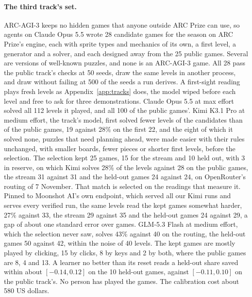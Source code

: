 \paragraph{The third track's set.} ARC-AGI-3 keeps no hidden games that anyone outside ARC Prize can use, so agents on Claude Opus 5.5 wrote 28 candidate games for the season on ARC Prize's engine, each with sprite types and mechanics of its own, a first level, a generator and a solver, and each designed away from the 25 public games. Several are versions of well-known puzzles, and none is an ARC-AGI-3 game. All 28 pass the public track's checks at 50 seeds, draw the same levels in another process, and draw without failing at 500 of the seeds a run derives. A first-sight reading plays fresh levels as Appendix~\ref{app:tracks} does, the model wiped before each level and free to ask for three demonstrations. Claude Opus 5.5 at max effort solved all 112 levels it played, and all 100 of the public games'. Kimi K3.1 Pro at medium effort, the track's model, first solved fewer levels of the candidates than of the public games, 19 against 28\% on the first 22, and the eight of which it solved none, puzzles that need planning ahead, were made easier with their rules unchanged, with smaller boards, fewer pieces or shorter first levels, before the selection. The selection kept 25 games, 15 for the stream and 10 held out, with 3 in reserve, on which Kimi solves 28\% of the levels against 28 on the public games, the stream 31 against 31 and the held-out games 24 against 24, on OpenRouter's routing of 7 November. That match is selected on the readings that measure it. Pinned to Moonshot AI's own endpoint, which served all our Kimi runs and serves every verified run, the same levels read the kept games somewhat harder, 27\% against 33, the stream 29 against 35 and the held-out games 24 against 29, a gap of about one standard error over games. GLM-5.3 Flash at medium effort, which the selection never saw, solves 43\% against 40 on the routing, the held-out games 50 against 42, within the noise of 40 levels. The kept games are mostly played by clicking, 15 by clicks, 8 by keys and 2 by both, where the public games are 8, 4 and 13. A learner no better than its reset reads a held-out share saved within about $[-0.14, 0.12]$ on the 10 held-out games, against $[-0.11, 0.10]$ on the public track's. No person has played the games. The calibration cost about 580 US dollars.

